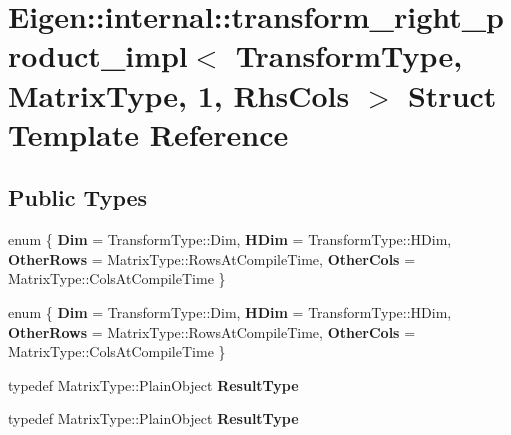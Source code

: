 \hypertarget{struct_eigen_1_1internal_1_1transform__right__product__impl_3_01_transform_type_00_01_matrix_type_00_011_00_01_rhs_cols_01_4}{}\section{Eigen\+:\+:internal\+:\+:transform\+\_\+right\+\_\+product\+\_\+impl$<$ Transform\+Type, Matrix\+Type, 1, Rhs\+Cols $>$ Struct Template Reference}
\label{struct_eigen_1_1internal_1_1transform__right__product__impl_3_01_transform_type_00_01_matrix_type_00_011_00_01_rhs_cols_01_4}
\subsection*{Public Types}
\begin{DoxyCompactItemize}
\item 
\mbox{\label{struct_eigen_1_1internal_1_1transform__right__product__impl_3_01_transform_type_00_01_matrix_type_00_011_00_01_rhs_cols_01_4_a1918d389c2ca99501390671c4cb810ad}} 
enum \{ {\bfseries Dim} = Transform\+Type\+:\+:Dim, 
{\bfseries H\+Dim} = Transform\+Type\+:\+:H\+Dim, 
{\bfseries Other\+Rows} = Matrix\+Type\+:\+:Rows\+At\+Compile\+Time, 
{\bfseries Other\+Cols} = Matrix\+Type\+:\+:Cols\+At\+Compile\+Time
 \}
\item 
\mbox{\label{struct_eigen_1_1internal_1_1transform__right__product__impl_3_01_transform_type_00_01_matrix_type_00_011_00_01_rhs_cols_01_4_aaae446a63669bc749e52fd5d2fd395dc}} 
enum \{ {\bfseries Dim} = Transform\+Type\+:\+:Dim, 
{\bfseries H\+Dim} = Transform\+Type\+:\+:H\+Dim, 
{\bfseries Other\+Rows} = Matrix\+Type\+:\+:Rows\+At\+Compile\+Time, 
{\bfseries Other\+Cols} = Matrix\+Type\+:\+:Cols\+At\+Compile\+Time
 \}
\item 
\mbox{\label{struct_eigen_1_1internal_1_1transform__right__product__impl_3_01_transform_type_00_01_matrix_type_00_011_00_01_rhs_cols_01_4_a2a1ca35510e3f48eff5f8c57d5bfd3e6}} 
typedef Matrix\+Type\+::\+Plain\+Object {\bfseries Result\+Type}
\item 
\mbox{\label{struct_eigen_1_1internal_1_1transform__right__product__impl_3_01_transform_type_00_01_matrix_type_00_011_00_01_rhs_cols_01_4_a2a1ca35510e3f48eff5f8c57d5bfd3e6}} 
typedef Matrix\+Type\+::\+Plain\+Object {\bfseries Result\+Type}
\end{DoxyCompactItemize}
